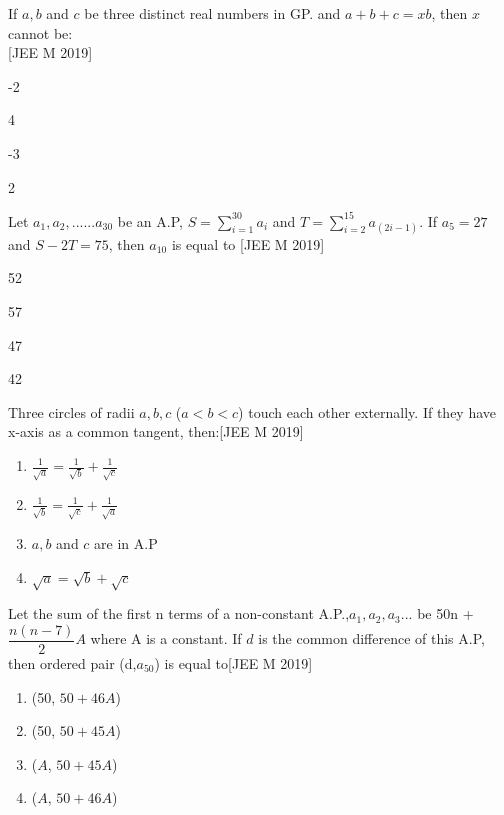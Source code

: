 \documentclass[journal,12pt,twocolumn]{IEEEtran}
\theoremstyle{remark}
\begin{document}
\begin{enumerate}
{{\begin{enumerate}
  \end{enumerate}}
  \item{If $a, b$ and $c$ be three distinct real numbers in GP. and $a+b+c=xb$, then $x$ cannot be:\\ \null \hfill{[JEE M 2019]}
\begin{enumerate}
  \begin{multicols}{2}
  \item {-2} \item{4}\columnbreak
  \item{-3}
  \item{2}
  \end{multicols}
  \end{enumerate}}
  \item {Let $a_{1},a_{2},......a_{30}$ be an A.P, $S=\sum_{i=1}^{30}a_{i}$ and $T=\sum_{i=2}^{15}a_{(2i-1)}$. If $a_{5}=27$
	  and $S-2T=75$, then $a_{10}$ is equal to \null \hfill{[JEE M 2019]}
\begin{enumerate}
  \begin{multicols}{2}
  \item {52} \item{57}\columnbreak
  \item{47}
  \item{42}
  \end{multicols}
  \end{enumerate}}
\item{Three circles of radii $a, b, c$ ($a<b<c$) touch each other externally. If they have x-axis as a common tangent, then:\hfill{[JEE M 2019]}\begin{enumerate} \itemsep.5em	
  
  \item {$\frac{1}{\sqrt{a}}=\frac{1}{\sqrt{b}}+\frac{1}{\sqrt{c}}$} 
  \item {$\frac{1}{\sqrt{b}}=\frac{1}{\sqrt{c}}+\frac{1}{\sqrt{a}}$} 
  \item{$a,b$ and $c$ are in A.P}
  \item{${\sqrt{a}}={\sqrt{b}}+{\sqrt{c}}$}
  \end{enumerate}} 
  \item{Let the sum of the first n terms of a non-constant A.P.,$a_{1},a_{2},a_{3}$... be 50n + $\dfrac{n(n-7)}{2}A$
	  where A is a constant. If $d$ is the common difference of this A.P, then ordered pair (d,$a_{50}$) is equal to\hfill{[JEE M 2019]}} \vspace{.5em}\begin{enumerate}
		  \itemsep.5em  \item {(50, $50+46A$)} \item{(50, $50+45A$)}
  \item{($A$, $50+45A$)}
  \item{($A$, $50+46A$)}
  \end{enumerate}}
  \end{enumerate}

  
\end{document}
